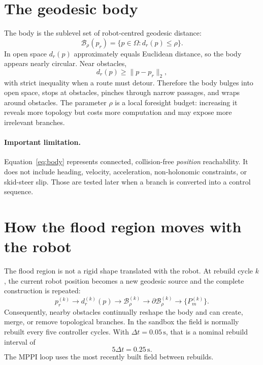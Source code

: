 \documentclass[11pt,a4paper]{article}
\newcommand{\Free}{\Omega}
\newcommand{\B}{\mathcal{B}}
\begin{document}
\section{The geodesic body}

The body is the sublevel set of robot-centred geodesic distance:
\begin{equation}
  \boxed{
  \B_\rho(p_r)=\{p\in\Free:d_r(p)\leq\rho\}.
  }
  \label{eq:body}
\end{equation}
In open space $d_r(p)$ approximately equals Euclidean distance, so the body
appears nearly circular. Near obstacles,
\begin{equation}
  d_r(p)\geq\lVert p-p_r\rVert_2,
\end{equation}
with strict inequality when a route must detour. Therefore the body bulges
into open space, stops at obstacles, pinches through narrow passages, and
wraps around obstacles. The parameter $\rho$ is a local foresight budget:
increasing it reveals more topology but costs more computation and may expose
more irrelevant branches.

\paragraph{Important limitation.}
Equation~\eqref{eq:body} represents connected, collision-free
\emph{position} reachability. It does not include heading, velocity,
acceleration, non-holonomic constraints, or skid-steer slip. Those are tested
later when a branch is converted into a control sequence.

\section{How the flood region moves with the robot}

The flood region is not a rigid shape translated with the robot. At rebuild cycle
$k$, the current robot position becomes a new geodesic source and the complete
construction is repeated:
\begin{equation}
  p_r^{(k)}
  \longrightarrow d_r^{(k)}(p)
  \longrightarrow \B_\rho^{(k)}
  \longrightarrow \partial\B_\rho^{(k)}
  \longrightarrow \{P_m^{(k)}\}.
  \label{eq:moving-rebuild}
\end{equation}
Consequently, nearby obstacles continually reshape the body and can create,
merge, or remove topological branches. In the sandbox the field is normally rebuilt
every five controller cycles. With $\Delta t=0.05\,\mathrm{s}$, that is a
nominal rebuild interval of
\begin{equation}
  5\Delta t=0.25\,\mathrm{s}.
\end{equation}
The MPPI loop uses the most recently built field between rebuilds.
\end{document}

